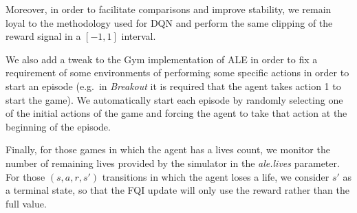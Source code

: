 Moreover, in order to facilitate comparisons and improve stability, we remain 
loyal to the methodology used for DQN and perform the same clipping of the 
reward signal in a $[-1, 1]$ interval. 

We also add a tweak to the Gym implementation of ALE in order to fix a 
requirement of some environments of performing some specific actions in 
order to start an episode (e.g.\ in \textit{Breakout} it is required that the 
agent takes action 1 to start the game). We automatically start each episode by 
randomly selecting one of the initial actions of the game and forcing the agent 
to take that action at the beginning of the episode. 

Finally, for those games in which the agent has a lives count, we monitor the 
number of remaining lives provided by the simulator in the \textit{ale.lives}
parameter. For those $(s, a, r, s')$ transitions in which the agent loses a life, 
we consider $s'$ as a terminal state, so that the FQI update will only 
use the reward rather than the full value. 

